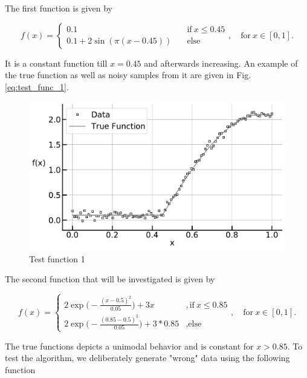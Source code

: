 \documentclass[10pt,a4paper]{article}
\begin{document}
The first function is given by

\begin{equation} \label{eq:test_func_1}
	f(x) = \begin{cases}
			 0.1 \quad &\text{if} \ x \le 0.45 \\ 
			 0.1 + 2\sin (\pi(x-0.45)) \quad &\text{else}  
		  \end{cases}, \quad \text{for} \ x \in [0, 1].
\end{equation}
	
It is a constant function till $x=0.45$ and afterwards increasing. An example of the true function as well as noisy samples from it are given in Fig. \ref{eq:test_func_1}.

\begin{figure}[H]
	\centering
	\includegraphics[width=\columnwidth]{../thesisplots/exp_inc1_data.pdf}
	\caption{Test function 1}
	\label{fig:test_func_1}
\end{figure}

The second function that will be investigated is given by

\begin{equation} \label{eq:test_func_2}
	f(x) = \begin{cases}
					2\exp \big(-\frac{(x-0.5)^2}{0.05} \big) + 3x  &,\text{if} \ x \le 0.85 \\
					2\exp \big(-\frac{(0.85-0.5)^2}{0.05} \big) + 3*0.85  &,\text{else}
	       \end{cases}, \quad \text{for} \ x \in [0,1]. 	
\end{equation}

The true functions depicts a unimodal behavior and is constant for $x > 0.85$. To test the algorithm, we deliberately generate "wrong" data using the following function
\end{document}
